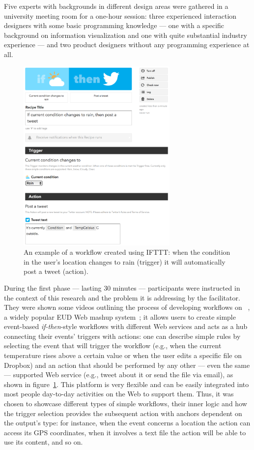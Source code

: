 Five experts with backgrounds in different design areas were gathered in a university meeting room for a one-hour session: three experienced interaction designers with some basic programming knowledge --- one with a specific background on information visualization and one with quite substantial industry experience --- and two product designers without any programming experience at all.

\begin{figure}[ht!]
\centering
\includegraphics[width=0.7\textwidth]{images/c4/IFTTT.png}
\caption{An example of a workflow created using \ac{IFTTT}: when the condition in the user's location changes to rain (trigger) it will automatically post a tweet (action).}\label{fig:ifttt}
\end{figure}

During the first phase --- lasting 30 minutes --- participants were instructed in the context of this research and the problem it is addressing by the facilitator. They were shown some videos outlining the process of developing workflows on ~\cite{IFTTT}, a widely popular \ac{EUD} Web mashup system~\cite{Malizia:2011tw}; it allows users to create simple event-based \emph{if-then}-style workflows with different Web services and acts as a hub connecting their events' triggers with actions: one can describe simple rules by selecting the event that will trigger the workflow (e.g., when the current temperature rises above a certain value or when the user edits a specific file on Dropbox) and an action that should be performed by any other --- even the same --- supported Web service (e.g., tweet about it or send the file via email), as shown in figure~\ref{fig:ifttt}. This platform is very flexible and can be easily integrated into most people day-to-day activities on the Web to support them. Thus, it was chosen to showcase different types of simple workflows, their inner logic and how the trigger selection provides the subsequent action with anchors dependent on the output's type: for instance, when the event concerns a location the action can access its GPS coordinates, when it involves a text file the action will be able to use its content, and so on.

